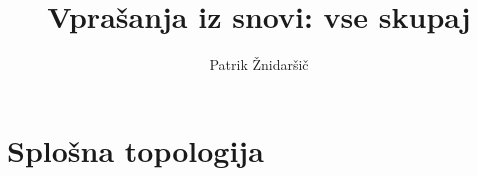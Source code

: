 \documentclass[12pt]{book}
\title{Vprašanja iz snovi: vse skupaj}
\author{Patrik Žnidaršič}
\date{}
\newcounter{vprasanja}
\begin{document}
\maketitle

\setcounter{vprasanja}{0}
\chapter{Splošna topologija}


\end{document}
